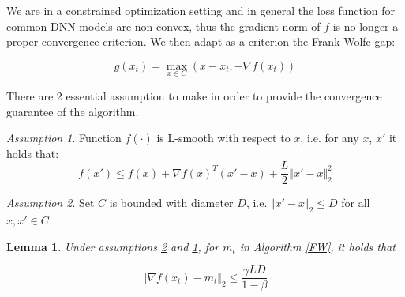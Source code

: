 \documentclass[10pt,twocolumn,letterpaper, english]{article}
\theoremstyle{definition}
\theoremstyle{plain}
\theoremstyle{plain}
\newtheorem{lemma}{Lemma}[subsection]
\theoremstyle{plain}
\theoremstyle{plain}
\theoremstyle{remark}
\theoremstyle{remark}
\newtheorem{ass}{Assumption}[subsection]
\theoremstyle{definition}
\theoremstyle{definition}
\theoremstyle{definition}
\theoremstyle{definition}
\begin{document}
We are in a constrained optimization setting and in general the loss function for common DNN models are non-convex, thus the gradient norm of $f$ is no longer a proper convergence criterion. We then adapt as a criterion the Frank-Wolfe gap:

\begin{equation} \label{gap}
    g(x_t)= \max_{x \in C} ( x-x_t, - \nabla f(x_t))
\end{equation}

There are 2 essential assumption to make in order to provide the convergence guarantee of the algorithm.

\begin{ass}\label{ass1}
Function $f(\cdot)$ is L-smooth with respect to $x$, i.e. for any $x$, $x'$ it holds that:
\begin{equation*}
    f(x') \le f(x) + \nabla f(x)^T (x' - x) + \frac{L}{2} \Vert x' -x \Vert_{2}^2
\end{equation*}
\end{ass}




\begin{ass}\label{ass2}
Set $C$ is bounded with diameter $D$, i.e. $\Vert x' -x \Vert_{2} \le D$ for all $x, x' \in C$

\end{ass}

\begin{lemma}
Under assumptions \ref{ass2} and \ref{ass1}, for $m_t$ in Algorithm \ref{FW}, it holds that

\begin{equation*}
    \Vert \nabla f(x_t) - m_t \Vert_{2} \le \frac{\gamma LD}{ 1 - \beta}
\end{equation*}
\end{lemma}
\end{document}
